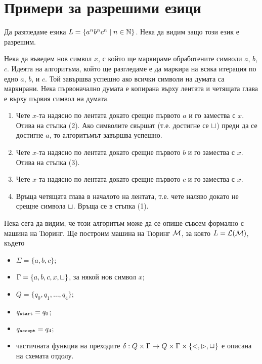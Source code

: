 \section{Примери за разрешими езици}

\begin{example}
  Да разгледаме езика $L = \{a^nb^nc^n \mid n\in\mathbb{N}\}$.
  Нека да видим защо този език е разрешим.
 
  Нека да въведем нов символ $x$, с който ще маркираме обработените символи $a$, $b$, $c$.
  Идеята на алгоритъма, който ще разгледаме е да маркира на всяка итерация по едно $a$, $b$, и $c$.
  Той завършва успешно ако всички символи на думата са маркирани.
  Нека първоначално думата е копирана върху лентата и четящата глава е върху първия символ на думата.
  \begin{enumerate}[(1)]
  \item 
    Чете $x$-та надясно по лентата докато срещне първото $a$ и го замества с $x$. Отива на стъпка (2).
    Ако символите свършат (т.е. достигне се $\sqcup$) преди да се достигне $a$,
    то алгоритъмът завършва успешно.
  \item
    Чете $x$-та надясно по лентата докато срещне първото $b$ и го замества с $x$.
    Отива на стъпка (3).
  \item
    Чете $x$-та надясно по лентата докато срещне първото $c$ и го замества с $x$.
  \item
    Връща четящата глава в началото на лентата, т.е. чете наляво докато не срещне символа $\sqcup$.
    Връща се в стъпка (1). 
  \end{enumerate}

  Нека сега да видим, че този алгоритъм може да се опише съвсем формално с машина на Тюринг.
  Ще построим машина на Тюринг $\mathcal{M}$, за която $L = \mathcal{L}(\mathcal{M})$, където
  \begin{itemize}
  \item 
    $\Sigma = \{a,b,c\}$;
  \item
    $\Gamma = \{a,b,c,x,\sqcup\}$, за някой нов символ $x$;
  \item
    $Q = \{q_0,q_1,\dots,q_4\}$;
  \item
    $q_{\texttt{start}} = q_0$;
  \item
    $q_{\texttt{accept}} = q_4$;
  \item
    частичната функция на преходите $\delta:Q\times\Gamma \to Q\times\Gamma\times\{\lhd,\rhd,\Box\}$
    е описана на схемата отдолу.
  \end{itemize}


\end{example}
